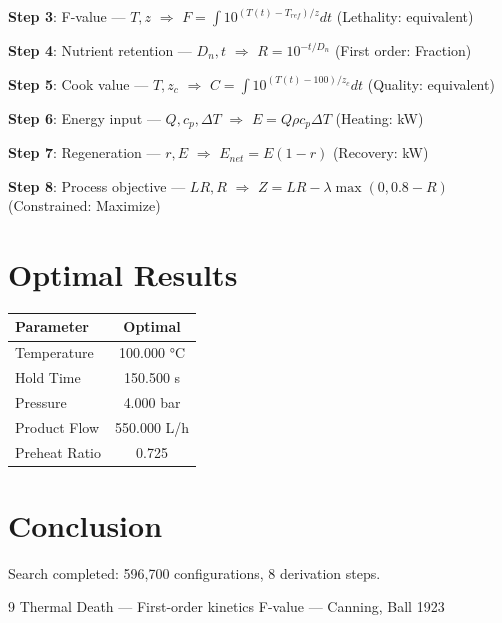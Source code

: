 \documentclass[11pt,twocolumn]{article}
\begin{document}
\textbf{Step 3}: F-value --- $T, z$ $\Rightarrow$ $F = \int 10^{(T(t)-T_{ref})/z} dt$ (Lethality: equivalent)


\textbf{Step 4}: Nutrient retention --- $D_n, t$ $\Rightarrow$ $R = 10^{-t/D_n}$ (First order: Fraction)


\textbf{Step 5}: Cook value --- $T, z_c$ $\Rightarrow$ $C = \int 10^{(T(t)-100)/z_c} dt$ (Quality: equivalent)


\textbf{Step 6}: Energy input --- $Q, c_p, \Delta T$ $\Rightarrow$ $E = Q \rho c_p \Delta T$ (Heating: kW)


\textbf{Step 7}: Regeneration --- $r, E$ $\Rightarrow$ $E_{net} = E(1-r)$ (Recovery: kW)


\textbf{Step 8}: Process objective --- $LR, R$ $\Rightarrow$ $Z = LR - \lambda \max(0, 0.8-R)$ (Constrained: Maximize)


\section{Optimal Results}
\begin{table}[h]
\centering
\begin{tabular}{@{}lc@{}}
\toprule
Parameter & Optimal \\
\midrule
Temperature & 100.000 °C \\
Hold Time & 150.500 s \\
Pressure & 4.000 bar \\
Product Flow & 550.000 L/h \\
Preheat Ratio & 0.725  \\
\bottomrule
\end{tabular}
\end{table}

\section{Conclusion}
Search completed: 596,700 configurations, 8 derivation steps.

\begin{thebibliography}{9}
 Thermal Death --- First-order kinetics
 F-value --- Canning, Ball 1923
\end{thebibliography}
\end{document}
